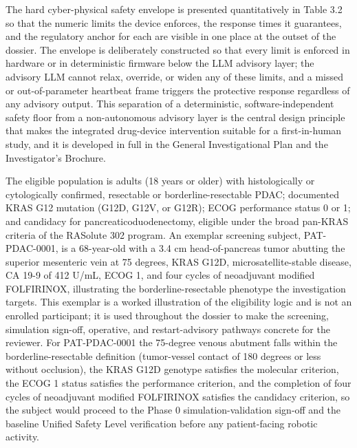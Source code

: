 The hard cyber-physical safety envelope is presented quantitatively in Table 3.2 so
that the numeric limits the device enforces, the response times it guarantees, and
the regulatory anchor for each are visible in one place at the outset of the
dossier. The envelope is deliberately constructed so that every limit is enforced
in hardware or in deterministic firmware below the LLM advisory layer; the advisory
LLM cannot relax, override, or widen any of these limits, and a missed or
out-of-parameter heartbeat frame triggers the protective response regardless of any
advisory output. This separation of a deterministic, software-independent safety
floor from a non-autonomous advisory layer is the central design principle that
makes the integrated drug-device intervention suitable for a first-in-human study,
and it is developed in full in the General Investigational Plan and the
Investigator's Brochure.



The eligible population is adults (18 years or older) with histologically or
cytologically confirmed, resectable or borderline-resectable PDAC; documented KRAS
G12 mutation (G12D, G12V, or G12R); ECOG performance status 0 or 1; and candidacy
for pancreaticoduodenectomy, eligible under the broad pan-KRAS criteria of the
RASolute 302 program. An exemplar screening subject, PAT-PDAC-0001, is a 68-year-old
with a 3.4 cm head-of-pancreas tumor abutting the superior mesenteric vein at 75
degrees, KRAS G12D, microsatellite-stable disease, CA 19-9 of 412 U/mL, ECOG 1, and
four cycles of neoadjuvant modified FOLFIRINOX, illustrating the borderline-resectable
phenotype the investigation targets. This exemplar is a worked illustration of the
eligibility logic and is not an enrolled participant; it is used throughout the
dossier to make the screening, simulation sign-off, operative, and restart-advisory
pathways concrete for the reviewer. For PAT-PDAC-0001 the 75-degree venous abutment
falls within the borderline-resectable definition (tumor-vessel contact of 180
degrees or less without occlusion), the KRAS G12D genotype satisfies the molecular
criterion, the ECOG 1 status satisfies the performance criterion, and the
completion of four cycles of neoadjuvant modified FOLFIRINOX satisfies the
candidacy criterion, so the subject would proceed to the Phase 0 simulation-validation
sign-off and the baseline Unified Safety Level verification before any
patient-facing robotic activity.

